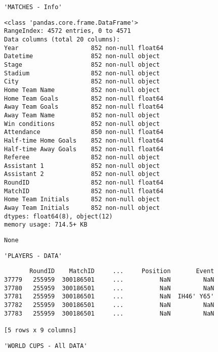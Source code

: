 \documentclass[11pt]{article}
\begin{document}
    
    \begin{verbatim}
'MATCHES - Info'
    \end{verbatim}

    
    \begin{Verbatim}[commandchars=\\\{\}]
<class 'pandas.core.frame.DataFrame'>
RangeIndex: 4572 entries, 0 to 4571
Data columns (total 20 columns):
Year                    852 non-null float64
Datetime                852 non-null object
Stage                   852 non-null object
Stadium                 852 non-null object
City                    852 non-null object
Home Team Name          852 non-null object
Home Team Goals         852 non-null float64
Away Team Goals         852 non-null float64
Away Team Name          852 non-null object
Win conditions          852 non-null object
Attendance              850 non-null float64
Half-time Home Goals    852 non-null float64
Half-time Away Goals    852 non-null float64
Referee                 852 non-null object
Assistant 1             852 non-null object
Assistant 2             852 non-null object
RoundID                 852 non-null float64
MatchID                 852 non-null float64
Home Team Initials      852 non-null object
Away Team Initials      852 non-null object
dtypes: float64(8), object(12)
memory usage: 714.5+ KB

    \end{Verbatim}

    
    \begin{verbatim}
None
    \end{verbatim}

    
    
    \begin{verbatim}
'PLAYERS - DATA'
    \end{verbatim}

    
    
    \begin{verbatim}
       RoundID    MatchID     ...     Position       Event
37779   255959  300186501     ...          NaN         NaN
37780   255959  300186501     ...          NaN         NaN
37781   255959  300186501     ...          NaN  IH46' Y65'
37782   255959  300186501     ...          NaN         NaN
37783   255959  300186501     ...          NaN         NaN

[5 rows x 9 columns]
    \end{verbatim}

    
    
    \begin{verbatim}
'WORLD CUPS - All DATA'
    \end{verbatim}
\end{document}
